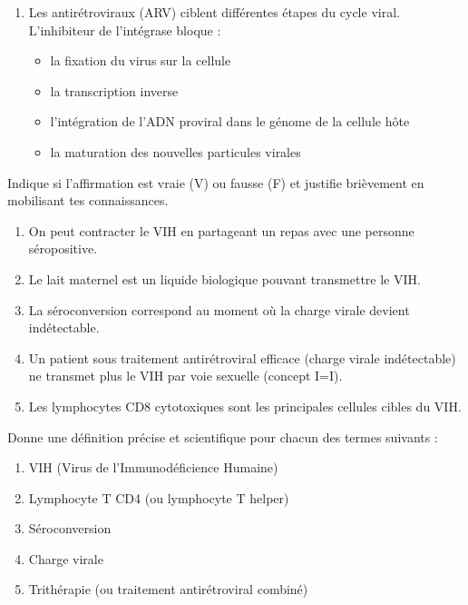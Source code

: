 \documentclass[11pt]{article}
\newcommand{\cle}[1]{{\popxbold\color{popdark}#1}}
\begin{document}
\begin{exercice}
\begin{enumerate}
\begin{itemize}
        \item[D.] les lymphocytes CD4 augmentent progressivement
    \end{itemize}
    \item Les antirétroviraux (ARV) ciblent différentes étapes du cycle viral. L'inhibiteur de l'intégrase bloque :
    \begin{itemize}
        \item[A.] la fixation du virus sur la cellule
        \item[B.] la transcription inverse
        \item[C.] l'intégration de l'ADN proviral dans le génome de la cellule hôte
        \item[D.] la maturation des nouvelles particules virales
    \end{itemize}
\end{enumerate}
\end{exercice}

\begin{exercice}
Indique si l'affirmation est vraie (V) ou fausse (F) et justifie brièvement en mobilisant tes connaissances.
\begin{enumerate}
    \item On peut contracter le VIH en partageant un repas avec une personne séropositive.
    \item Le lait maternel est un liquide biologique pouvant transmettre le VIH.
    \item La séroconversion correspond au moment où la charge virale devient indétectable.
    \item Un patient sous traitement antirétroviral efficace (charge virale indétectable) ne transmet plus le VIH par voie sexuelle (concept I=I).
    \item Les lymphocytes CD8 cytotoxiques sont les principales cellules cibles du VIH.
\end{enumerate}
\end{exercice}

\begin{exercice}
Donne une définition précise et scientifique pour chacun des termes suivants :
\begin{enumerate}
    \item \cle{VIH} (Virus de l'Immunodéficience Humaine)
    \item \cle{Lymphocyte T CD4} (ou lymphocyte T helper)
    \item \cle{Séroconversion}
    \item \cle{Charge virale}
    \item \cle{Trithérapie} (ou traitement antirétroviral combiné)
\end{enumerate}
\end{exercice}
\end{document}
